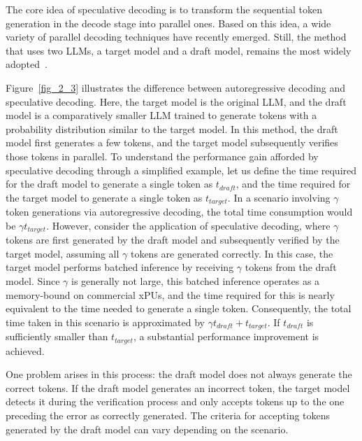 The core idea of speculative decoding is to transform the sequential token generation in the decode stage into parallel ones. Based on this idea, a wide variety of parallel decoding techniques have recently emerged. Still, the method that uses two LLMs, a target model and a draft model, remains the most widely adopted~\cite{speculativedecoding}.

Figure~\ref{fig_2_3} illustrates the difference between autoregressive decoding and speculative decoding. Here, the target model is the original LLM, and the draft model is a comparatively smaller LLM trained to generate tokens with a probability distribution similar to the target model. In this method, the draft model first generates a few tokens, and the target model subsequently verifies those tokens in parallel. To understand the performance gain afforded by speculative decoding through a simplified example, let us define the time required for the draft model to generate a single token as $t_{draft}$, and the time required for the target model to generate a single token as $t_{target}$. In a scenario involving $\gamma$ token generations via autoregressive decoding, the total time consumption would be $\gamma t_{target}$. However, consider the application of speculative decoding, where $\gamma$ tokens are first generated by the draft model and subsequently verified by the target model, assuming all $\gamma$ tokens are generated correctly. In this case, the target model performs batched inference by receiving $\gamma$ tokens from the draft model. Since $\gamma$ is generally not large, this batched inference operates as a memory-bound on commercial xPUs, and the time required for this is nearly equivalent to the time needed to generate a single token. Consequently, the total time taken in this scenario is approximated by $\gamma t_{draft}+t_{target}$. If $t_{draft}$ is sufficiently smaller than $t_{target}$, a substantial performance improvement is achieved.


One problem arises in this process: the draft model does not always generate the correct tokens. If the draft model generates an incorrect token, the target model detects it during the verification process and only accepts tokens up to the one preceding the error as correctly generated. The criteria for accepting tokens generated by the draft model can vary depending on the scenario.


